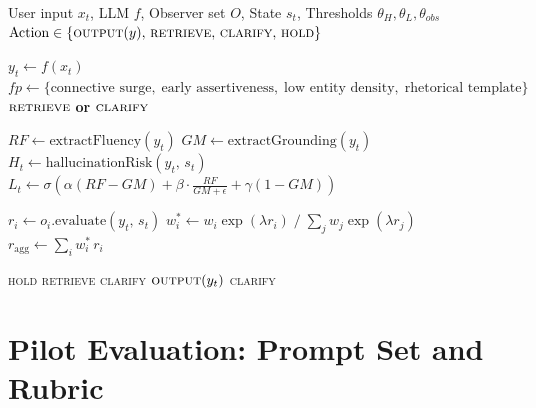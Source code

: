 \documentclass[11pt,a4paper]{article}
\begin{document}
\begin{algorithm}
\caption{ReikaSystem External Control Logic}
\label{alg:control}
\begin{algorithmic}[1]
\Require User input $x_t$, LLM $f$, Observer set $O$, State $s_t$, Thresholds $\theta_H,\theta_L,\theta_{obs}$
\Ensure $\text{Action} \in \{\textsc{output}(y),\,\textsc{retrieve},\,\textsc{clarify},\,\textsc{hold}\}$

\State $y_t \leftarrow f(x_t)$ 
\State $\mathit{fp} \leftarrow \{\text{connective surge},\;\text{early assertiveness},\;\text{low entity density},\;\text{rhetorical template}\}$
 
  \State \Return $\textsc{retrieve}$ \textbf{or} $\textsc{clarify}$
\EndIf

\State $RF \leftarrow \mathrm{extractFluency}(y_t)$
\State $GM \leftarrow \mathrm{extractGrounding}(y_t)$
\State $H_t \leftarrow \mathrm{hallucinationRisk}(y_t,\,s_t)$
\State $L_t \leftarrow \sigma\!\left(\alpha(RF-GM)+\beta\cdot\frac{RF}{GM+\epsilon}+\gamma(1-GM)\right)$

  \State $r_i \leftarrow o_i.\mathrm{evaluate}(y_t,\,s_t)$
\EndFor
\State $w_i^{*} \leftarrow w_i\exp(\lambda r_i)\;/\;\sum_j w_j\exp(\lambda r_j)$ 
\State $r_{\mathrm{agg}} \leftarrow \sum_i w_i^{*}\,r_i$

  \State \Return \textsc{hold} 
  \State \Return \textsc{retrieve} 
  \State \Return \textsc{clarify} 
\Else
    \State \Return $\textsc{output}(y_t)$ 
  \Else
    \State \Return \textsc{clarify} 
  \EndIf
\EndIf
\end{algorithmic}
\end{algorithm}

\section{Pilot Evaluation: Prompt Set and Rubric}
\label{app:prompts}
\end{document}
